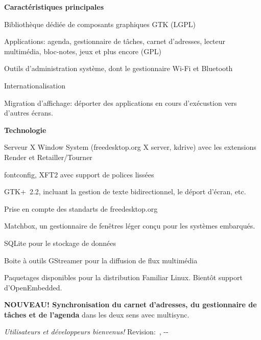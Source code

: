 {\smallskip
\textbf{Caract{\'e}ristiques principales}
\begin{compactitem}
   \item Biblioth{\`e}que d{\'e}di{\'e}e de composants graphiques GTK (LGPL)
   \item Applications: agenda, gestionnaire de t{\^a}ches, carnet d'adresses,
     lecteur multim{\'e}dia, bloc-notes, jeux et plus encore (GPL)
   \item Outils d'administration syst{\`e}me, dont le gestionnaire Wi-Fi et Bluetooth
   \item Internationalisation
   \item Migration d'affichage: d{\'e}porter des applications en cours d'ex{\'e}custion vers d'autres {\'e}crans.
\end{compactitem}

\smallskip
\textbf{Technologie}
\begin{compactitem}
   \item Serveur X Window System{\texttrademark}{} (freedesktop.org X
     server, kdrive) avec les extensions Render et
     Retailler/Tourner
   \item fontconfig, XFT2 avec support de polices liss{\'e}es
   \item GTK+~2.2, incluant la gestion de texte bidirectionnel, le d{\'e}port d'{\'e}cran, etc.
   \item Prise en compte des standarts de freedesktop.org
   \item Matchbox, un gestionnaire de fen{\^e}tres l{\'e}ger con\c{c}u pour les syst{\`e}mes embarqu{\'e}s.
   \item SQLite pour le stockage de donn{\'e}es
   \item Boite {\`a} outils GStreamer pour la diffusion de flux multim{\'e}dia
   \item Paquetages disponibles pour la distribution Familiar Linux. Bient{\^o}t support d'OpenEmbedded.
   \item \textbf{NOUVEAU! Synchronisation du carnet d'adresses, du gestionnaire de t{\^a}ches et de l'agenda} dans
   	les deux sens avec multisync.
\end{compactitem}

\smallskip
\textit{{\textexclamdown}Utilisateurs et d{\'e}veloppeurs bienvenus!}%
\hfill\tiny{Revision:~\rcsInfoRevision, \rcsInfoYear-\rcsInfoMonth-\rcsInfoDay}
}


